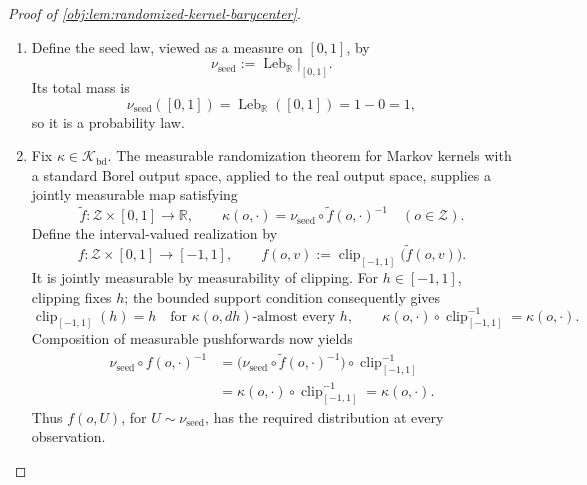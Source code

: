 \begin{proof}[Proof of \cref{obj:lem:randomized-kernel-barycenter}]
\begin{enumerate}
For the conversion to a real value, use
\[
\operatorname{rv}:[0,\infty]\to\mathbb R,
\qquad
\operatorname{rv}|_{[0,\infty)}=\operatorname{id},
\qquad
\operatorname{rv}(\infty)=0.
\]
The bounds \(0\le\mathcal R_{\mathrm{bd}}\le4\) place every bounded-kernel
supremum, and their infimum, in \([0,4]\). On this interval the real and
extended orders agree, so conversion commutes with these suprema and the
infimum. For an empty parameter set both kinds of supremum equal zero.
It follows that
\[
\operatorname{rv}\!\left(
\inf_{\kappa\in\mathcal K_{\mathrm{real}}}
\sup_{\lambda\in\Lambda}\mathcal R_{\mathrm{ext}}(\kappa,\lambda)
\right)
=
\inf_{\kappa\in\mathcal K_{\mathrm{bd}}}
\sup_{\lambda\in\Lambda}\mathcal R_{\mathrm{bd}}(\kappa,\lambda),
\]
where the right side is now evaluated in \(\mathbb R\). %

\item Define the seed law, viewed as a measure on \([0,1]\), by
\[
\nu_{\mathrm{seed}}
:=\left.\operatorname{Leb}_{\mathbb R}\right|_{[0,1]}.
\]
Its total mass is
\[
\nu_{\mathrm{seed}}([0,1])
=\operatorname{Leb}_{\mathbb R}([0,1])
=1-0=1,
\]
so it is a probability law. %

\item Fix \(\kappa\in\mathcal K_{\mathrm{bd}}\). The measurable randomization
theorem for Markov kernels with a standard Borel output space, applied to the
real output space, supplies a jointly measurable map satisfying
\[
\widetilde f:\mathcal Z\times[0,1]\to\mathbb R,
\qquad
\kappa(o,\cdot)
=
\nu_{\mathrm{seed}}\circ\widetilde f(o,\cdot)^{-1}
\quad(o\in\mathcal Z).
\]
Define the interval-valued realization by
\[
f:\mathcal Z\times[0,1]\to[-1,1],
\qquad
f(o,v):=\operatorname{clip}_{[-1,1]}\bigl(\widetilde f(o,v)\bigr).
\]
It is jointly measurable by measurability of clipping. For
\(h\in[-1,1]\), clipping fixes \(h\); the bounded support condition consequently
gives
\[
\operatorname{clip}_{[-1,1]}(h)=h
\quad\text{for }\kappa(o,dh)\text{-almost every }h,
\qquad
\kappa(o,\cdot)\circ\operatorname{clip}_{[-1,1]}^{-1}
=\kappa(o,\cdot).
\]
Composition of measurable pushforwards now yields
\[
\begin{aligned}
\nu_{\mathrm{seed}}\circ f(o,\cdot)^{-1}
&=
\bigl(\nu_{\mathrm{seed}}\circ\widetilde f(o,\cdot)^{-1}\bigr)
\circ\operatorname{clip}_{[-1,1]}^{-1}\\
&=\kappa(o,\cdot)\circ\operatorname{clip}_{[-1,1]}^{-1}
=\kappa(o,\cdot).
\end{aligned}
\]
Thus \(f(o,U)\), for \(U\sim\nu_{\mathrm{seed}}\), has the required distribution
at every observation. %


\end{enumerate}
\end{proof}
